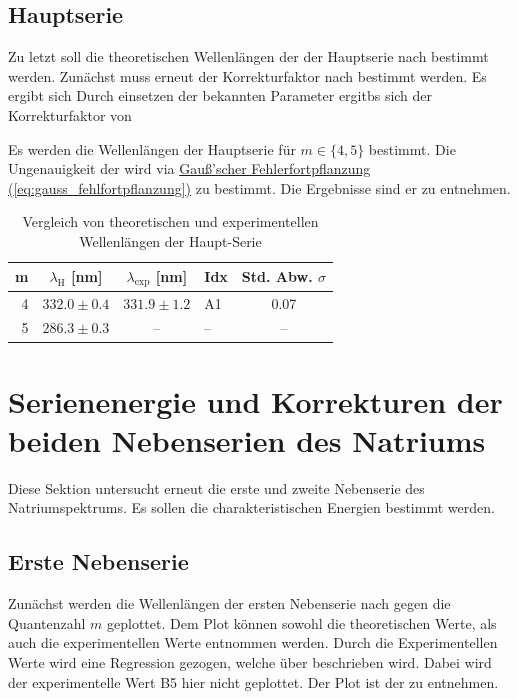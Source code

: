 \subsection*{Hauptserie}
Zu letzt soll die theoretischen Wellenlängen der der Hauptserie nach  bestimmt werden. Zunächst muss erneut der Korrekturfaktor nach  bestimmt werden. Es ergibt sich
Durch einsetzen der bekannten Parameter ergitbs sich der Korrekturfaktor von

Es werden die Wellenlängen der Hauptserie für $m \in \{4,5\}$ bestimmt. Die Ungenauigkeit der  wird via \hyperref[eq:gauss_fehlfortpflanzung]{Gauß'scher Fehlerfortpflanzung (\ref*{eq:gauss_fehlfortpflanzung})} zu 
bestimmt. Die Ergebnisse sind er  zu entnehmen.

\begin{table}[h!]
    \caption{Vergleich von theoretischen und experimentellen Wellenlängen der Haupt-Serie}
    \label{tab:H_lambdas}
    \centering
    \begin{tabular}{r | c c | l || c}
        \toprule
        m & $\lambda_{\text{H}}$ [nm] & $\lambda_{\text{exp}}$ [nm] & Idx & Std. Abw. $\sigma$ \\
        \midrule
        4 & $332.0 \pm 0.4$ & $331.9 \pm 1.2$ & A1 & 0.07 \\
        5 & $286.3 \pm 0.3$ & -- & -- & -- \\
        \bottomrule
    \end{tabular}
\end{table}

\section{Serienenergie und Korrekturen der beiden Nebenserien des Natriums}
Diese Sektion untersucht erneut die erste und zweite Nebenserie des Natriumspektrums. Es sollen die charakteristischen Energien bestimmt werden. 

\subsection{Erste Nebenserie}
Zunächst werden die Wellenlängen der ersten Nebenserie nach  gegen die Quantenzahl $m$ geplottet. Dem Plot können sowohl die theoretischen Werte, als auch die experimentellen Werte entnommen werden. Durch die Experimentellen Werte wird eine Regression gezogen, welche über 
beschrieben wird. Dabei wird der experimentelle Wert B5 hier nicht geplottet. Der Plot ist der  zu entnehmen.

